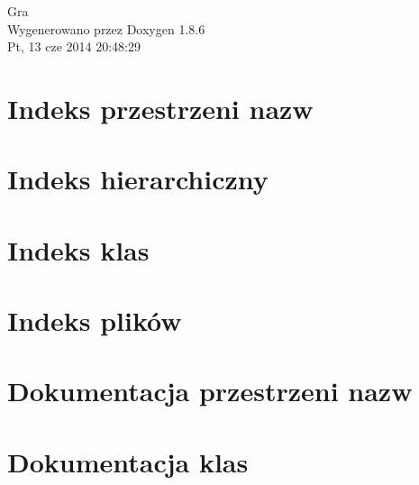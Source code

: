 \documentclass[twoside]{book}
\newcommand{\clearemptydoublepage}{%
  \newpage{\pagestyle{empty}\cleardoublepage}%
}
\begin{document}
\hypersetup{pageanchor=false}
\begin{titlepage}
\vspace*{7cm}
\begin{center}%
{\Large Gra }\\
\vspace*{1cm}
{\large Wygenerowano przez Doxygen 1.8.6}\\
\vspace*{0.5cm}
{\small Pt, 13 cze 2014 20:48:29}\\
\end{center}
\end{titlepage}
\clearemptydoublepage
\tableofcontents
\clearemptydoublepage
{}
\hypersetup{pageanchor=true}

\chapter{Indeks przestrzeni nazw}

\chapter{Indeks hierarchiczny}

\chapter{Indeks klas}

\chapter{Indeks plików}

\chapter{Dokumentacja przestrzeni nazw}

\chapter{Dokumentacja klas}




















\end{document}
